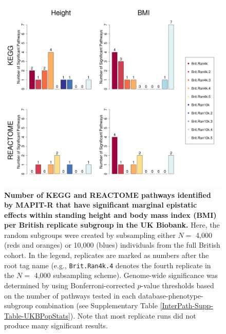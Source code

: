 \documentclass[10pt]{article}
\begin{document}
\begin{figure}[htbp]
\centering
\hspace*{-1.75cm}
\includegraphics[scale=.45]{Images/Supp/InterPath_Supp_Figure_BritReps_Barplot_vs4.png}
\caption{\textbf{Number of KEGG and REACTOME pathways identified by MAPIT-R that have significant marginal epistatic effects within standing height and body mass index (BMI) per British replicate subgroup in the UK Biobank.} Here, the random subgroups were created by subsampling either $N =$ 4,000 (reds and oranges) or 10,000 (blues) individuals from the full British cohort. In the legend, replicates are marked as numbers after the root tag name (e.g., \texttt{Brit.Ran4k.4} denotes the fourth replicate in the $N =$ 4,000 subsampling scheme). Genome-wide significance was determined by using Bonferroni-corrected $p$-value thresholds based on the number of pathways tested in each database-phenotype-subgroup combination (see Supplementary Table \ref{InterPath-Supp-Table-UKBPopStats}). Note that most replicate runs did not produce many significant results.}
\label{InterPath-Supp-Figure-BritReps-Barplots}
\end{figure}
\clearpage

\end{document}
